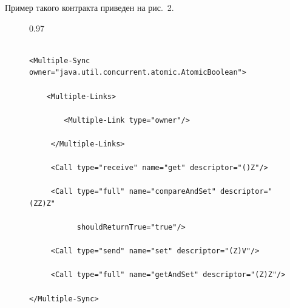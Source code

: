 {  Пример такого контракта приведен на рис.~2.



\begin{figure}[b] %

{\small \begin{center}

\begin{fmpage}{0.97\textwidth}

\begin{verbatim}

<Multiple-Sync owner="java.util.concurrent.atomic.AtomicBoolean">

    <Multiple-Links>

        <Multiple-Link type="owner"/>

     </Multiple-Links>

     <Call type="receive" name="get" descriptor="()Z"/>

     <Call type="full" name="compareAndSet" descriptor="(ZZ)Z"

           shouldReturnTrue="true"/>

     <Call type="send" name="set" descriptor="(Z)V"/>

     <Call type="full" name="getAndSet" descriptor="(Z)Z"/>

</Multiple-Sync>

\end{verbatim}

\end{fmpage}

\end{center}}

\vspace*{-6pt}


  \end{figure}



  }



